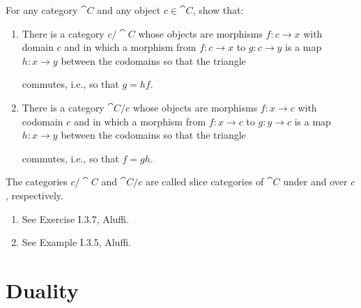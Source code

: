 \documentclass[notes,tikz]{agony}
\renewcommand{\C}{\cat{C}}
\begin{document}
\begin{xca}\label{xca:slice}
  For any category $\C$ and any object $c \in \C$, show that:
  \begin{enumerate}
    \item There is a category $c/\C$ whose objects are morphisms
          $f : c \to x$ with domain $c$ and
          in which a morphism from $f : c \to x$ to $g : c \to y$
          is a map $h : x \to y$ between the codomains so that the triangle
          \begin{center}
          \end{center}
          commutes, i.e., so that $g = hf$.
    \item There is a category $\C/c$ whose objects are morphisms
          $f : x \to c$ with codomain $c$ and
          in which a morphism from $f : x \to c$ to $g : y \to c$
          is a map $h : x \to y$ between the codomains so that the triangle
          \begin{center}
          \end{center}
          commutes, i.e., so that $f = gh$.
  \end{enumerate}
  The categories $c/\C$ and $\C/c$ are called slice categories of $\C$ under and over $c$, respectively.
\end{xca}
\begin{enumerate}
  \item See Exercise I.3.7, Aluffi.
  \item See Example I.3.5, Aluffi.
\end{enumerate}

\section{Duality}
\end{document}
